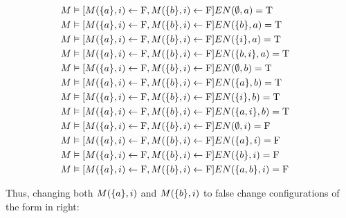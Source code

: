 \begin{frame}
    \begin{align*}
        M & \vDash[M(\{a\},i)\leftarrow \mathrm{F},M(\{b\},i)\leftarrow \mathrm{F}]EN(\emptyset,a) = \mathrm{T}      & \\
        M & \vDash[M(\{a\},i)\leftarrow \mathrm{F},M(\{b\},i)\leftarrow \mathrm{F}]EN(\{b\},a)= \mathrm{T}    & \\
        M & \vDash[M(\{a\},i)\leftarrow \mathrm{F},M(\{b\},i)\leftarrow \mathrm{F}]EN(\{i\},a) = \mathrm{T}   & \\
        M & \vDash[M(\{a\},i)\leftarrow \mathrm{F},M(\{b\},i)\leftarrow \mathrm{F}]EN(\{b,i\},a)= \mathrm{T}  & \\
        M & \vDash[M(\{a\},i)\leftarrow \mathrm{F},M(\{b\},i)\leftarrow \mathrm{F}]EN(\emptyset,b)   = \mathrm{T}    & \\
        M & \vDash[M(\{a\},i)\leftarrow \mathrm{F},M(\{b\},i)\leftarrow \mathrm{F}]EN(\{a\},b) = \mathrm{T}   & \\
        M & \vDash[M(\{a\},i)\leftarrow \mathrm{F},M(\{b\},i)\leftarrow \mathrm{F}]EN(\{i\},b) = \mathrm{T}   & \\
        M & \vDash[M(\{a\},i)\leftarrow \mathrm{F},M(\{b\},i)\leftarrow \mathrm{F}]EN(\{a,i\},b) = \mathrm{T} & \\
        M & \vDash[M(\{a\},i)\leftarrow \mathrm{F},M(\{b\},i)\leftarrow \mathrm{F}]EN(\emptyset,i) = \mathrm{F}      & \\
        M & \vDash[M(\{a\},i)\leftarrow \mathrm{F},M(\{b\},i)\leftarrow \mathrm{F}]EN(\{a\},i) = \mathrm{F}   & \\
        M & \vDash[M(\{a\},i)\leftarrow \mathrm{F},M(\{b\},i)\leftarrow \mathrm{F}]EN(\{b\},i)  = \mathrm{F}  & \\
        M & \vDash[M(\{a\},i)\leftarrow \mathrm{F},M(\{b\},i)\leftarrow \mathrm{F}]EN(\{a,b\},i)= \mathrm{F}  & \\
    \end{align*}
\end{frame}

\begin{frame}
    Thus, changing both $M(\{a\},i)$ and $M(\{b\},i)$ to false change
    configurations of the form in right:
    \begin{center}
    \end{center}

\end{frame}

